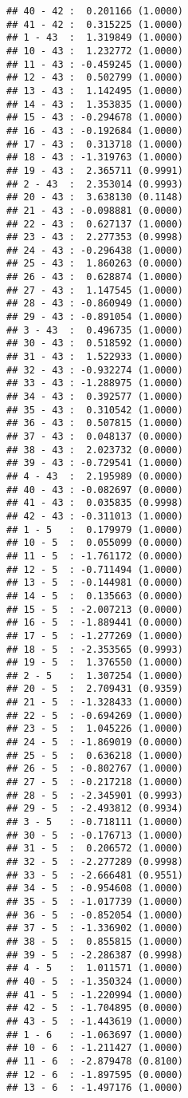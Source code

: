 \documentclass[12pt,]{article}
\begin{document}
\begin{verbatim}
## 40 - 42 :  0.201166 (1.0000)
## 41 - 42 :  0.315225 (1.0000)
## 1 - 43  :  1.319849 (1.0000)
## 10 - 43 :  1.232772 (1.0000)
## 11 - 43 : -0.459245 (1.0000)
## 12 - 43 :  0.502799 (1.0000)
## 13 - 43 :  1.142495 (1.0000)
## 14 - 43 :  1.353835 (1.0000)
## 15 - 43 : -0.294678 (1.0000)
## 16 - 43 : -0.192684 (1.0000)
## 17 - 43 :  0.313718 (1.0000)
## 18 - 43 : -1.319763 (1.0000)
## 19 - 43 :  2.365711 (0.9991)
## 2 - 43  :  2.353014 (0.9993)
## 20 - 43 :  3.638130 (0.1148)
## 21 - 43 : -0.098881 (0.0000)
## 22 - 43 :  0.627137 (1.0000)
## 23 - 43 :  2.277353 (0.9998)
## 24 - 43 : -0.296438 (1.0000)
## 25 - 43 :  1.860263 (0.0000)
## 26 - 43 :  0.628874 (1.0000)
## 27 - 43 :  1.147545 (1.0000)
## 28 - 43 : -0.860949 (1.0000)
## 29 - 43 : -0.891054 (1.0000)
## 3 - 43  :  0.496735 (1.0000)
## 30 - 43 :  0.518592 (1.0000)
## 31 - 43 :  1.522933 (1.0000)
## 32 - 43 : -0.932274 (1.0000)
## 33 - 43 : -1.288975 (1.0000)
## 34 - 43 :  0.392577 (1.0000)
## 35 - 43 :  0.310542 (1.0000)
## 36 - 43 :  0.507815 (1.0000)
## 37 - 43 :  0.048137 (0.0000)
## 38 - 43 :  2.023732 (0.0000)
## 39 - 43 : -0.729541 (1.0000)
## 4 - 43  :  2.195989 (0.0000)
## 40 - 43 : -0.082697 (0.0000)
## 41 - 43 :  0.035835 (0.9998)
## 42 - 43 : -0.311013 (1.0000)
## 1 - 5   :  0.179979 (1.0000)
## 10 - 5  :  0.055099 (0.0000)
## 11 - 5  : -1.761172 (0.0000)
## 12 - 5  : -0.711494 (1.0000)
## 13 - 5  : -0.144981 (0.0000)
## 14 - 5  :  0.135663 (0.0000)
## 15 - 5  : -2.007213 (0.0000)
## 16 - 5  : -1.889441 (0.0000)
## 17 - 5  : -1.277269 (1.0000)
## 18 - 5  : -2.353565 (0.9993)
## 19 - 5  :  1.376550 (1.0000)
## 2 - 5   :  1.307254 (1.0000)
## 20 - 5  :  2.709431 (0.9359)
## 21 - 5  : -1.328433 (1.0000)
## 22 - 5  : -0.694269 (1.0000)
## 23 - 5  :  1.045226 (1.0000)
## 24 - 5  : -1.869019 (0.0000)
## 25 - 5  :  0.636218 (1.0000)
## 26 - 5  : -0.802767 (1.0000)
## 27 - 5  : -0.217218 (1.0000)
## 28 - 5  : -2.345901 (0.9993)
## 29 - 5  : -2.493812 (0.9934)
## 3 - 5   : -0.718111 (1.0000)
## 30 - 5  : -0.176713 (1.0000)
## 31 - 5  :  0.206572 (1.0000)
## 32 - 5  : -2.277289 (0.9998)
## 33 - 5  : -2.666481 (0.9551)
## 34 - 5  : -0.954608 (1.0000)
## 35 - 5  : -1.017739 (1.0000)
## 36 - 5  : -0.852054 (1.0000)
## 37 - 5  : -1.336902 (1.0000)
## 38 - 5  :  0.855815 (1.0000)
## 39 - 5  : -2.286387 (0.9998)
## 4 - 5   :  1.011571 (1.0000)
## 40 - 5  : -1.350324 (1.0000)
## 41 - 5  : -1.220994 (1.0000)
## 42 - 5  : -1.704895 (0.0000)
## 43 - 5  : -1.443619 (1.0000)
## 1 - 6   : -1.063697 (1.0000)
## 10 - 6  : -1.211427 (1.0000)
## 11 - 6  : -2.879478 (0.8100)
## 12 - 6  : -1.897595 (0.0000)
## 13 - 6  : -1.497176 (1.0000)

\end{verbatim}
\end{document}
